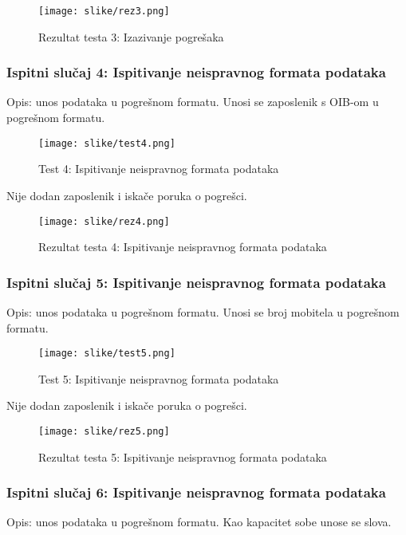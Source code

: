 \begin{figure}[H]
	\texttt{[image: slike/rez3.png]}
	\centering
	\caption{Rezultat testa 3: Izazivanje pogrešaka}
	\label{fig:rez3}
\end{figure}

\eject

\subsubsection{Ispitni slučaj 4: Ispitivanje neispravnog formata podataka}
Opis: unos podataka u pogrešnom formatu. Unosi se zaposlenik s OIB-om u pogrešnom formatu.

\begin{figure}[H]
	\texttt{[image: slike/test4.png]}
	\centering
	\caption{Test 4: Ispitivanje neispravnog formata podataka}
	\label{fig:test4}
\end{figure}

Nije dodan zaposlenik i iskače poruka o pogrešci. 

\begin{figure}[H]
	\texttt{[image: slike/rez4.png]}
	\centering
	\caption{Rezultat testa 4: Ispitivanje neispravnog formata podataka}
	\label{fig:rez4}
\end{figure}

\eject

\subsubsection{Ispitni slučaj 5: Ispitivanje neispravnog formata podataka}
Opis: unos podataka u pogrešnom formatu. Unosi se broj mobitela u pogrešnom formatu. 

\begin{figure}[H]
	\texttt{[image: slike/test5.png]}
	\centering
	\caption{Test 5: Ispitivanje neispravnog formata podataka}
	\label{fig:test5}
\end{figure}

Nije dodan zaposlenik i iskače poruka o pogrešci. 

\begin{figure}[H]
	\texttt{[image: slike/rez5.png]}
	\centering
	\caption{Rezultat testa 5: Ispitivanje neispravnog formata podataka}
	\label{fig:rez5}
\end{figure}

\eject

\subsubsection{Ispitni slučaj 6: Ispitivanje neispravnog formata podataka}
Opis: unos podataka u pogrešnom formatu. Kao kapacitet sobe unose se slova.  

